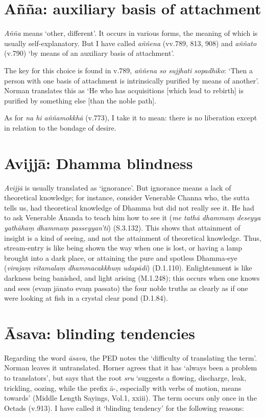 
\section*{A\~n\~na: auxiliary basis of attachment}\label{transl-auxiliary-basis}

\textit{Añña} means `other, different'. It occurs in various forms, the meaning of which is usually self-explanatory. But I have called \textit{aññena} (vv.789, 813, 908) and \textit{aññato} (v.790) `by means of an auxiliary basis of attachment'. 

The key for this choice is found in v.789, \textit{aññena so sujjhati sopadhīko}: `Then a person with one basis of attachment is intrinsically purified by means of another'. Norman translates this as `He who has acquisitions [which lead to rebirth] is purified by something else [than the noble path].

As for \textit{na hi aññamokkhā} (v.773), I take it to mean: there is no liberation except in relation to the bondage of desire.

\section*{Avijj\=a: Dhamma blindness}

\textit{Avijjā} is usually translated as `ignorance'. But ignorance means a lack of theoretical knowledge; for instance, consider Venerable Channa who, the sutta tells us, had theoretical knowledge of Dhamma but did not really see it. He had to ask Venerable \=Ananda to teach him how to see it (\textit{me tathā dhammaṃ deseyya yathāhaṃ dhammaṃ passeyyan'ti}) (S.3.132). This shows that attainment of insight is a kind of seeing, and not the attainment of theoretical knowledge. Thus, stream-entry is like being shown the way when one is lost, or having a lamp brought into a dark place, or attaining the pure and spotless Dhamma-eye (\textit{virajaṃ vītamalaṃ dhammacakkhuṃ udapādi}) (D.1.110). Enlightenment is like darkness being banished, and light arising (M.1.248); this occurs when one knows and sees (evaṃ jānato evaṃ passato) the four noble truths as clearly as if one were looking at fish in a crystal clear pond (D.1.84).

\section*{\=Asava: blinding tendencies}\label{transl-blinding-tendencies}

Regarding the word \textit{āsava}, the PED notes the `difficulty of translating the term'. Norman leaves it untranslated. Horner agrees that it has `always been a problem to translators', but says that the root \textit{sru} `suggests a flowing, discharge, leak, trickling, oozing, while the prefix ā-, especially with verbs of motion, means towards' (Middle Length Sayings, Vol.1, xxiii). The term occurs only once in the Octads (v.913). I have called it `blinding tendency' for the following reasons:

